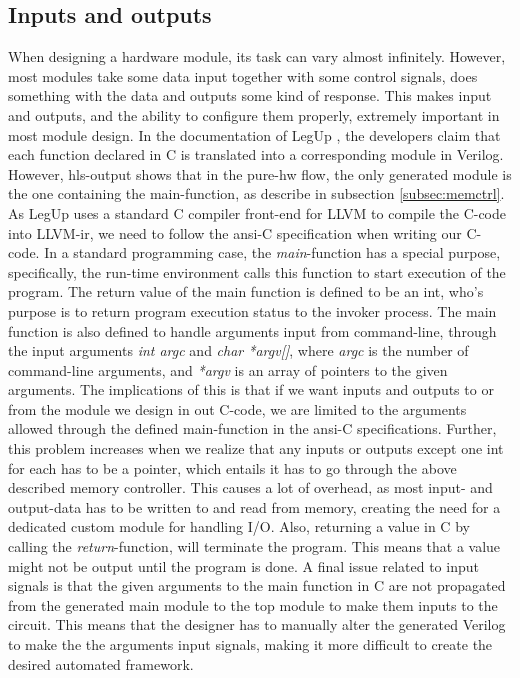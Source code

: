 \subsection{\label{subsec:inoutprobs}Inputs and outputs}
When designing a hardware module, its task can vary almost infinitely. However, most modules take some data input together with some control signals, does something with the data and outputs some kind of response. This makes input and outputs, and the ability to configure them properly, extremely important in most module design. In the documentation of LegUp \cite{leguparch}, the developers claim that each function declared in C is translated into a corresponding module in Verilog. However, \gls{hls}-output shows that in the pure-\gls{hw} flow, the only generated module is the one containing the main-function, as describe in subsection \ref{subsec:memctrl}. As LegUp uses a standard C compiler front-end for LLVM to compile the C-code into LLVM-\gls{ir}, we need to follow the \gls{ansi}-C specification \cite{isoc} when writing our C-code. In a standard programming case, the \textit{main}-function has a special purpose, specifically, the run-time environment calls this function to start execution of the program. The return value of the main function is defined to be an int, who's purpose is to return program execution status to the invoker process. The main function is also defined to handle arguments input from command-line, through the input arguments \textit{int argc} and \textit{char *argv[]}, where \textit{argc} is the number of command-line arguments, and \textit{*argv} is an array of pointers to the given arguments. The implications of this is that if we want inputs and outputs to or from the module we design in out C-code, we are limited to the arguments allowed through the defined main-function in the \gls{ansi}-C specifications. Further, this problem increases when we realize that any inputs or outputs except one int for each has to be a pointer, which entails it has to go through the above described memory controller. This causes a lot of overhead, as most input- and output-data has to be written to and read from memory, creating the need for a dedicated custom module for handling I/O. Also, returning a value in C by calling the \textit{return}-function, will terminate the program. This means that a value might not be output until the program is done. A final issue related to input signals is that the given arguments to the main function in C are not propagated from the generated main module to the top module to make them inputs to the circuit. This means that the designer has to manually alter the generated Verilog to make the the arguments input signals, making it more difficult to create the desired automated framework.
